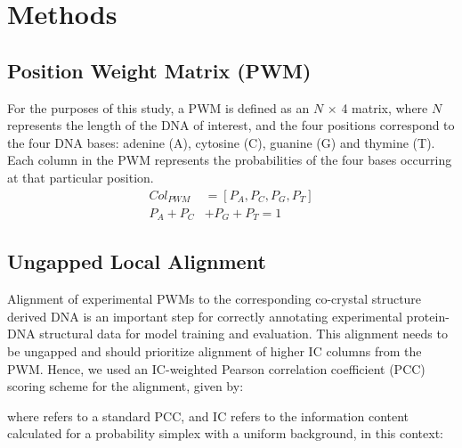 \section{Methods}
\subsection{Position Weight Matrix (PWM)}
For the purposes of this study, a PWM is defined as an $N$ × 4 matrix,
where $N$ represents the length of the DNA of interest, and the four
positions correspond to the four DNA bases: adenine (A), cytosine (C),
guanine (G) and thymine (T). Each column in the PWM represents the
probabilities of the four bases occurring at that particular position.
\begin{align*}
Col_{PWM} &= [P_A, P_C, P_G, P_T]\\
P_A + P_C &+ P_G + P_T = 1
\end{align*}
\subsection{Ungapped Local Alignment}
Alignment of experimental PWMs to the corresponding co-crystal structure derived DNA is an important step for correctly annotating experimental protein-DNA structural data for model training and evaluation. This alignment needs to be ungapped and should prioritize alignment of higher IC columns from the PWM. Hence, we used an IC-weighted Pearson correlation coefficient (PCC) scoring scheme for the alignment, given by:


where  refers to a standard PCC, and IC refers to the information content calculated for a probability simplex with a uniform background, in this context:

